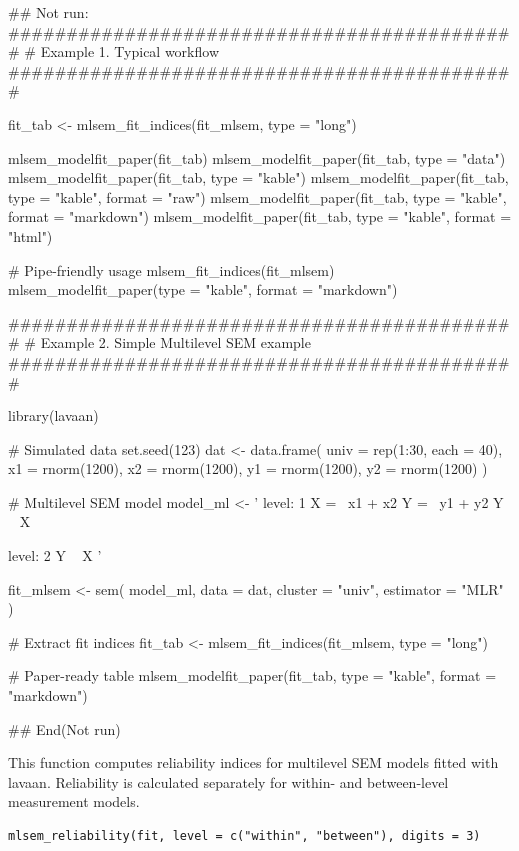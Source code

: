 \documentclass[a4paper]{book}
\begin{document}
\begin{Examples}
\begin{ExampleCode}
\#\# Not run: 
############################################
# Example 1. Typical workflow
############################################

fit_tab <- mlsem_fit_indices(fit_mlsem, type = "long")

mlsem_modelfit_paper(fit_tab)
mlsem_modelfit_paper(fit_tab, type = "data")
mlsem_modelfit_paper(fit_tab, type = "kable")
mlsem_modelfit_paper(fit_tab, type = "kable", format = "raw")
mlsem_modelfit_paper(fit_tab, type = "kable", format = "markdown")
mlsem_modelfit_paper(fit_tab, type = "kable", format = "html")

# Pipe-friendly usage
mlsem_fit_indices(fit_mlsem) %
  mlsem_modelfit_paper(type = "kable", format = "markdown")


############################################
# Example 2. Simple Multilevel SEM example
############################################

library(lavaan)

# Simulated data
set.seed(123)
dat <- data.frame(
  univ = rep(1:30, each = 40),
  x1 = rnorm(1200),
  x2 = rnorm(1200),
  y1 = rnorm(1200),
  y2 = rnorm(1200)
)

# Multilevel SEM model
model_ml <- '
  level: 1
    X =~ x1 + x2
    Y =~ y1 + y2
    Y ~ X

  level: 2
    Y ~ X
'

fit_mlsem <- sem(
  model_ml,
  data    = dat,
  cluster = "univ",
  estimator = "MLR"
)

# Extract fit indices
fit_tab <- mlsem_fit_indices(fit_mlsem, type = "long")

# Paper-ready table
mlsem_modelfit_paper(fit_tab, type = "kable", format = "markdown")

## End(Not run)
\end{ExampleCode}
\end{Examples}
%
\begin{Description}
This function computes reliability indices for multilevel SEM models
fitted with lavaan. Reliability is calculated separately for within-
and between-level measurement models.
\end{Description}
%
\begin{Usage}
\begin{verbatim}
mlsem_reliability(fit, level = c("within", "between"), digits = 3)
\end{verbatim}
\end{Usage}
\end{document}
